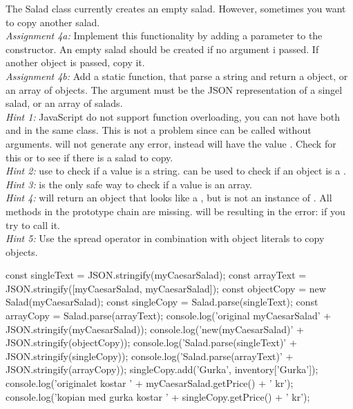 \documentclass[fleqn, article, a4paper]{memoir}
\begin{document}
\begin{Assignments}
\item The Salad class currently creates an empty salad. However, sometimes you want to copy another salad. 
\\ \emph{Assignment 4a:} Implement this functionality by adding a parameter to the constructor. An empty salad should be created if no argument i passed. If another  object is passed, copy it.
\\ \emph{Assignment 4b:}  Add a static function,  that parse a string and return a  object, or an array of  objects. The argument must be the JSON representation of a singel salad, or an array of salads. 
\\\emph{Hint 1:} JavaScript do not support function overloading, you can not have both  and  in the same class. This is not a problem since  can be called without arguments.  will not generate any error, instead  will have the value . Check for this or  to see if there is a salad to copy.
\\\emph{Hint 2:} use  to check if a value is a string.  can be used to check if an object is a .
\\\emph{Hint 3:}  is the only safe way to check if a value is an array.
\\\emph{Hint 4:}  will return an object that looks like a , but is not an instance of . All methods in the prototype chain are missing.  will be  resulting in the error:  if you try to call it.
\\\emph{Hint 5:} Use the spread operator in combination with object literals to copy objects.
\begin{Code}
const singleText = JSON.stringify(myCaesarSalad);
const arrayText = JSON.stringify([myCaesarSalad, myCaesarSalad]);
const objectCopy = new Salad(myCaesarSalad);
const singleCopy = Salad.parse(singleText);
const arrayCopy = Salad.parse(arrayText);
console.log('original myCaesarSalad\n' + JSON.stringify(myCaesarSalad));
console.log('new(myCaesarSalad)\n' + JSON.stringify(objectCopy));
console.log('Salad.parse(singleText)\n' + JSON.stringify(singleCopy));
console.log('Salad.parse(arrayText)\n' + JSON.stringify(arrayCopy));
singleCopy.add('Gurka', inventory['Gurka']);
console.log('originalet kostar ' + myCaesarSalad.getPrice() + ' kr');
console.log('kopian med gurka kostar ' + singleCopy.getPrice() + ' kr');
\end{Code}


\end{Assignments}
\end{document}
